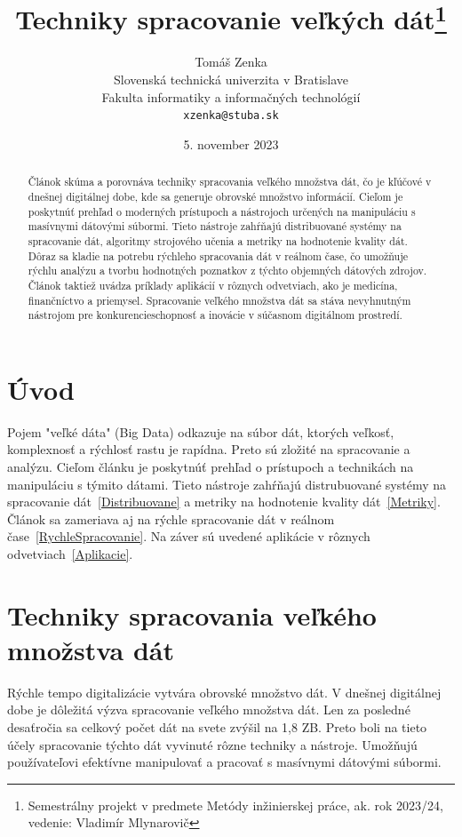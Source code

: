 \documentclass[10pt,slovak,a4paper]{article}
\title{Techniky spracovanie veľkých dát\thanks{Semestrálny projekt v predmete Metódy inžinierskej práce, ak. rok 2023/24, vedenie: Vladimír Mlynarovič}} %
\author{Tomáš Zenka\\[2pt]
	{\small Slovenská technická univerzita v Bratislave}\\
	{\small Fakulta informatiky a informačných technológií}\\
	{\small \texttt{xzenka@stuba.sk}}
	}
\date{\small 5. november 2023} %
\begin{document}
\maketitle

\begin{abstract}
Článok skúma a porovnáva techniky spracovania veľkého množstva dát, čo je kľúčové v dnešnej digitálnej dobe, kde sa generuje obrovské množstvo informácií. Cieľom je poskytnúť prehľad o moderných prístupoch a nástrojoch určených na manipuláciu s masívnymi dátovými súbormi. Tieto nástroje zahŕňajú distribuované systémy na spracovanie dát, algoritmy strojového učenia a metriky na hodnotenie kvality dát. Dôraz sa kladie na potrebu rýchleho spracovania dát v reálnom čase, čo umožňuje rýchlu analýzu a tvorbu hodnotných poznatkov z týchto objemných dátových zdrojov. Článok taktiež uvádza príklady aplikácií v rôznych odvetviach, ako je medicína, finančníctvo a priemysel. Spracovanie veľkého množstva dát sa stáva nevyhnutným nástrojom pre konkurencieschopnosť a inovácie v súčasnom digitálnom prostredí.
\end{abstract}
\newpage


\section{Úvod}

Pojem "veľké dáta" (Big Data) odkazuje na súbor dát, ktorých veľkosť, komplexnosť a rýchlosť rastu je rapídna. Preto sú zložité na spracovanie a analýzu.\cite{ZakladneInfo} Cieľom článku je poskytnúť prehľad o prístupoch a technikách na manipuláciu s týmito dátami. Tieto nástroje zahŕňajú distrubuované systémy na spracovanie dát~\ref{Distribuovane}  a metriky na hodnotenie kvality dát~\ref{Metriky}. Článok sa zameriava aj na rýchle spracovanie dát v reálnom čase~\ref{RychleSpracovanie}. Na záver sú uvedené aplikácie v rôznych odvetviach~\ref{Aplikacie}.



\section{Techniky spracovania veľkého množstva dát} \label{Techniky}

Rýchle tempo digitalizácie vytvára obrovské množstvo dát. V dnešnej digitálnej dobe je dôležitá výzva spracovanie veľkého množstva dát. Len za posledné desaťročia sa celkový počet dát na svete zvýšil na 1,8 ZB\cite{Survey}. Preto boli na tieto účely spracovanie týchto dát vyvinuté rôzne techniky a nástroje. Umožňujú používateľovi efektívne manipulovať a pracovať s masívnymi dátovými súbormi.
\end{document}
